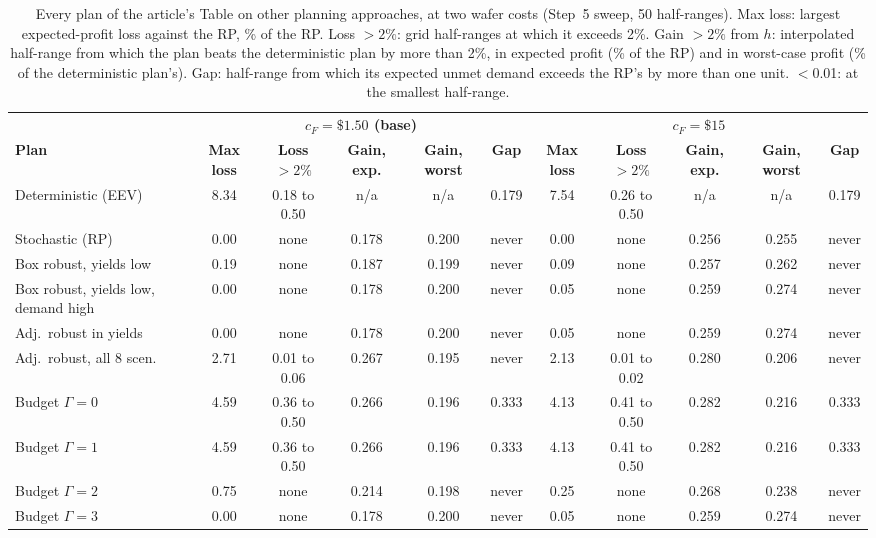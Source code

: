 \begin{table}[t]
\centering
\caption{Every plan of the article's Table on other planning approaches, at two wafer costs (Step~5 sweep, 50 half-ranges). Max loss: largest expected-profit loss against the RP, \% of the RP. Loss $>2\%$: grid half-ranges at which it exceeds 2\%. Gain $>2\%$ from $h$: interpolated half-range from which the plan beats the deterministic plan by more than 2\%, in expected profit (\% of the RP) and in worst-case profit (\% of the deterministic plan's). Gap: half-range from which its expected unmet demand exceeds the RP's by more than one unit. $<$0.01: at the smallest half-range.}
\label{tab:S-extA-paradigms}
\footnotesize
\setlength{\tabcolsep}{3pt}
\begin{tabular}{@{}l ccccc ccccc@{}}
\toprule
 & \multicolumn{5}{c}{\textbf{$c_F=\$1.50$ (base)}} & \multicolumn{5}{c}{\textbf{$c_F=\$15$}} \\
\cmidrule(lr){2-6}\cmidrule(l){7-11}
\textbf{Plan} & \textbf{Max loss} & \textbf{Loss $>2\%$} & \textbf{Gain, exp.} & \textbf{Gain, worst} & \textbf{Gap} & \textbf{Max loss} & \textbf{Loss $>2\%$} & \textbf{Gain, exp.} & \textbf{Gain, worst} & \textbf{Gap} \\
\midrule
Deterministic (EEV) & 8.34 & 0.18 to 0.50 & n/a & n/a & 0.179 & 7.54 & 0.26 to 0.50 & n/a & n/a & 0.179 \\
Stochastic (RP) & 0.00 & none & 0.178 & 0.200 & never & 0.00 & none & 0.256 & 0.255 & never \\
Box robust, yields low & 0.19 & none & 0.187 & 0.199 & never & 0.09 & none & 0.257 & 0.262 & never \\
Box robust, yields low, demand high & 0.00 & none & 0.178 & 0.200 & never & 0.05 & none & 0.259 & 0.274 & never \\
Adj.\ robust in yields & 0.00 & none & 0.178 & 0.200 & never & 0.05 & none & 0.259 & 0.274 & never \\
Adj.\ robust, all 8 scen. & 2.71 & 0.01 to 0.06 & 0.267 & 0.195 & never & 2.13 & 0.01 to 0.02 & 0.280 & 0.206 & never \\
Budget $\Gamma=0$ & 4.59 & 0.36 to 0.50 & 0.266 & 0.196 & 0.333 & 4.13 & 0.41 to 0.50 & 0.282 & 0.216 & 0.333 \\
Budget $\Gamma=1$ & 4.59 & 0.36 to 0.50 & 0.266 & 0.196 & 0.333 & 4.13 & 0.41 to 0.50 & 0.282 & 0.216 & 0.333 \\
Budget $\Gamma=2$ & 0.75 & none & 0.214 & 0.198 & never & 0.25 & none & 0.268 & 0.238 & never \\
Budget $\Gamma=3$ & 0.00 & none & 0.178 & 0.200 & never & 0.05 & none & 0.259 & 0.274 & never \\

\end{tabular}
\end{table}
